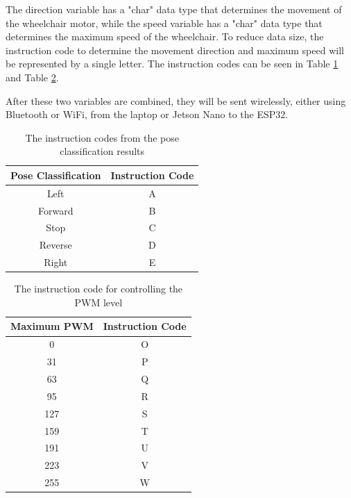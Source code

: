 The direction variable has a "char" data type that determines the movement of the wheelchair motor, while the speed variable has a "char" data type that determines the maximum speed of the wheelchair. To reduce data size, the instruction code to determine the movement direction and maximum speed will be represented by a single letter. The instruction codes can be seen in Table \ref{tbl:kode-instruksi} and Table \ref{tbl:kodePWM}.

After these two variables are combined, they will be sent wirelessly, either using Bluetooth or WiFi, from the laptop or Jetson Nano to the ESP32.
\begin{table}[h]
  \centering
      \caption{The instruction codes from the pose classification results}
      \label{tbl:kode-instruksi}
      \begin{tabular}{|c|c|}
          \hline
          Pose Classification & Instruction Code \\ \hline
          Left             & A              \\ \hline
          Forward             & B              \\ \hline
          Stop             & C              \\ \hline
          Reverse           & D              \\ \hline
          Right            & E              \\ \hline
      \end{tabular}
\end{table}

\begin{table}[!ht]
    \centering
    \caption{The instruction code for controlling the PWM level}
    \label{tbl:kodePWM}
    \begin{tabular}{|c|c|}
    \hline
    Maximum PWM & Instruction Code \\ \hline
    0           & O                \\ \hline
    31          & P                \\ \hline
    63          & Q                \\ \hline
    95          & R                \\ \hline
    127         & S                \\ \hline
    159         & T                \\ \hline
    191         & U                \\ \hline
    223         & V                \\ \hline
    255         & W                \\ \hline
    \end{tabular}
    \end{table}

